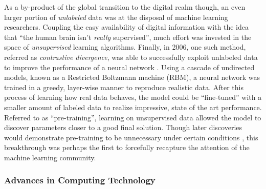 As a by-product of the global transition to the digital realm though, an even larger portion of \emph{unlabeled} data was at the disposal of machine learning researchers.
Coupling the easy availability of digital information with the idea that ``the human brain isn't \emph{really} supervised'', much effort was invested in the space of \emph{unsupervised} learning algorithms. %
Finally, in 2006, one such method, referred as \emph{contrastive divergence}, was able to successfully exploit unlabeled data to improve the performance of a neural network \cite{Hinton2006Fast}.
Using a cascade of undirected models, known as a Restricted Boltzmann machine (RBM), a neural network was trained in a greedy, layer-wise manner to reproduce realistic data.
After this process of learning how real data behaves, the model could be ``fine-tuned'' with a smaller amount of labeled data to realize impressive, state of the art performance.
Referred to as ``pre-training'', learning on unsupervised data allowed the model to discover parameters closer to a good final solution.
Though later discoveries would demonstrate pre-training to be unnecessary under certain conditions \cite{Zeiler2013Rectified}, this breakthrough was perhaps the first to forcefully recapture the attention of the machine learning community.



\subsubsection{Advances in Computing Technology}
\label{subsubsec:hardware}

